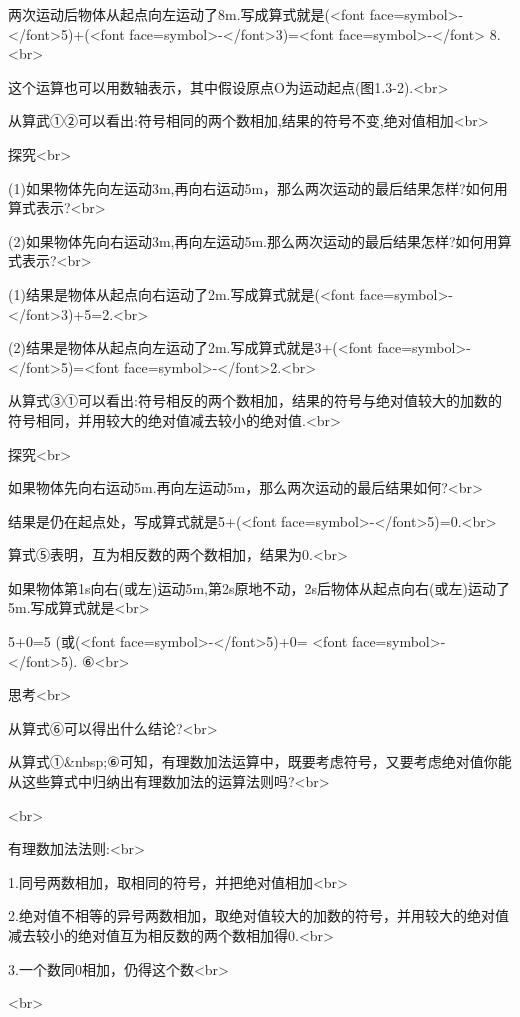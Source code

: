 两次运动后物体从起点向左运动了8m.写成算式就是(<font face=symbol>-</font>5)+(<font face=symbol>-</font>3)=<font face=symbol>-</font> 8.<br>


这个运算也可以用数轴表示，其中假设原点O为运动起点(图1.3-2).<br>


从算武①②可以看出:符号相同的两个数相加,结果的符号不变,绝对值相加<br>


探究<br>


(1)如果物体先向左运动3m,再向右运动5m，那么两次运动的最后结果怎样?如何用算式表示?<br>
 
(2)如果物体先向右运动3m,再向左运动5m.那么两次运动的最后结果怎样?如何用算式表示?<br>


(1)结果是物体从起点向右运动了2m.写成算式就是(<font face=symbol>-</font>3)+5=2.<br>

(2)结果是物体从起点向左运动了2m.写成算式就是3+(<font face=symbol>-</font>5)=<font face=symbol>-</font>2.<br>


从算式③①可以看出:符号相反的两个数相加，结果的符号与绝对值较大的加数的符号相同，并用较大的绝对值减去较小的绝对值.<br>


探究<br>


如果物体先向右运动5m.再向左运动5m，那么两次运动的最后结果如何?<br>


结果是仍在起点处，写成算式就是5+(<font face=symbol>-</font>5)=0.<br>


算式⑤表明，互为相反数的两个数相加，结果为0.<br>


如果物体第1s向右(或左)运动5m,第2s原地不动，2s后物体从起点向右(或左)运动了5m.写成算式就是<br>


5+0=5 (或(<font face=symbol>-</font>5)+0= <font face=symbol>-</font>5).  ⑥<br>


思考<br>


从算式⑥可以得出什么结论?<br>


从算式①&nbsp;⑥可知，有理数加法运算中，既要考虑符号，又要考虑绝对值你能从这些算式中归纳出有理数加法的运算法则吗?<br>


\beginpropertory<br>

有理数加法法则:<br>


1.同号两数相加，取相同的符号，并把绝对值相加<br>


2.绝对值不相等的异号两数相加，取绝对值较大的加数的符号，并用较大的绝对值减去较小的绝对值互为相反数的两个数相加得0.<br>


3.一个数同0相加，仍得这个数<br>

\endpropertory<br>


\beginexample
    
